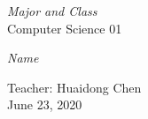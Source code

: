 {\begin{titlepage}
\begin{minipage}[t]{0.5\textwidth}
	\begin{flushleft}
		{\large \textit{Major and Class}\\ Computer Science 01	\unskip\strut
		}
	\end{flushleft}
\end{minipage}%
%
\begin{minipage}[t]{0.5\textwidth}
	\begin{flushright}
		{\large \textit{Name}\\ \names	\unskip\strut}           
		\vspace*{0.5cm}
	\end{flushright}    
\end{minipage}%

\vspace{4cm}
\begin{center}
\begin{minipage}[h]{\textwidth}
    \vfill
    \begin{center}
        {\large Teacher: Huaidong Chen \\ June 23, 2020}
    \end{center}    
\end{minipage}%
\end{center}

\end{titlepage}
}
